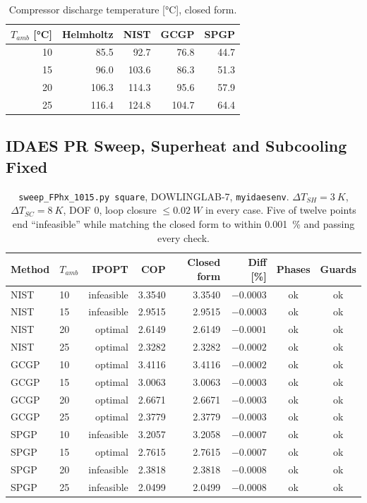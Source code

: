 \documentclass{article}
\begin{document}
\begin{table}[h]
\centering
\begin{tabular}{rrrrr}
\toprule
$T_{amb}$ [\si{\celsius}] & Helmholtz & NIST & GCGP & SPGP \\
\midrule
10 & 85.5 & 92.7 & 76.8 & 44.7 \\
15 & 96.0 & 103.6 & 86.3 & 51.3 \\
20 & 106.3 & 114.3 & 95.6 & 57.9 \\
25 & 116.4 & 124.8 & 104.7 & 64.4 \\
\bottomrule
\end{tabular}
\caption{Compressor discharge temperature [\si{\celsius}], closed form.}
\end{table}

\subsection{IDAES PR Sweep, Superheat and Subcooling Fixed}
\begin{table}[h]
\centering
\begin{tabular}{llrrrrcc}
\toprule
Method & $T_{amb}$ & IPOPT & COP & Closed form & Diff [\%] & Phases & Guards \\
\midrule
NIST & 10 & infeasible & 3.3540 & 3.3540 & $-0.0003$ & ok & ok \\
NIST & 15 & infeasible & 2.9515 & 2.9515 & $-0.0003$ & ok & ok \\
NIST & 20 & optimal & 2.6149 & 2.6149 & $-0.0001$ & ok & ok \\
NIST & 25 & optimal & 2.3282 & 2.3282 & $-0.0002$ & ok & ok \\
GCGP & 10 & optimal & 3.4116 & 3.4116 & $-0.0002$ & ok & ok \\
GCGP & 15 & optimal & 3.0063 & 3.0063 & $-0.0003$ & ok & ok \\
GCGP & 20 & optimal & 2.6671 & 2.6671 & $-0.0003$ & ok & ok \\
GCGP & 25 & optimal & 2.3779 & 2.3779 & $-0.0003$ & ok & ok \\
SPGP & 10 & infeasible & 3.2057 & 3.2058 & $-0.0007$ & ok & ok \\
SPGP & 15 & optimal & 2.7615 & 2.7615 & $-0.0007$ & ok & ok \\
SPGP & 20 & infeasible & 2.3818 & 2.3818 & $-0.0008$ & ok & ok \\
SPGP & 25 & infeasible & 2.0499 & 2.0499 & $-0.0008$ & ok & ok \\
\bottomrule
\end{tabular}
\caption{\texttt{sweep\_FPhx\_1015.py square}, DOWLINGLAB-7, \texttt{myidaesenv}.
$\Delta T_{SH}=\SI{3}{K}$, $\Delta T_{SC}=\SI{8}{K}$, DOF 0, loop closure
$\le \SI{0.02}{W}$ in every case. Five of twelve points end ``infeasible''
while matching the closed form to within \SI{0.001}{\percent} and passing every check.}
\end{table}
\end{document}
